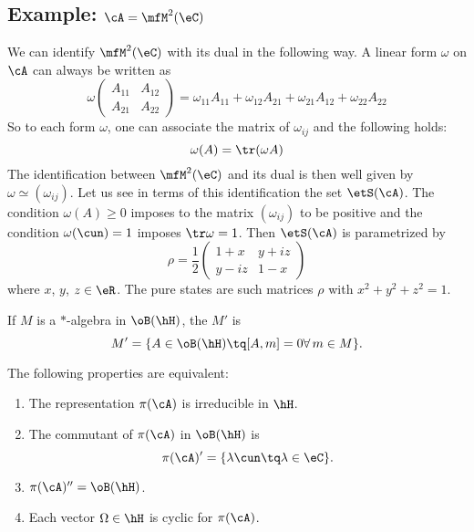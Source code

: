 \subsection*{Example: \texorpdfstring{$\cA=\mfM^2(\eC)$}{A=M2C}}
We can identify $\mfM^2(\eC)$ with its dual in the following way. A linear form $\omega$ on $\cA$ can always be written as
\[
	\omega
	\begin{pmatrix}
		A_{11} & A_{12} \\
		A_{21} & A_{22}
	\end{pmatrix}
	=\omega_{11}A_{11} +\omega_{12}A_{21}+ \omega_{21}A_{12}+ \omega_{22}A_{22}
\]
So to each form $\omega$, one can associate the matrix of $\omega_{ij}$ and the following holds:
\[
	\omega(A)=\tr(\omega A)
\]
The identification between $\mfM^2(\eC)$ and its dual is then well given by $\omega\simeq(\omega_{ij})$. Let us see in terms of this identification the set $\etS(\cA)$. The condition $\omega(A)\geq 0$ imposes to the matrix $(\omega_{ij})$ to be positive and the condition $\omega(\cun)=1$ imposes $\tr\omega=1$. Then $\etS(\cA)$ is parametrized by
\[
	\rho=\frac{ 1 }{2}
	\begin{pmatrix}
		1+x  & y+iz \\
		y-iz & 1-x
	\end{pmatrix}
\]
where $x$, $y$, $z\in\eR$. The pure states are such matrices $\rho$ with $x^2+y^2+z^2=1$.

If $M$ is a $*$-algebra in $\oB(\hH)$, the  $M'$ is
\[
	M'=\{ A\in\oB(\hH)\tq [A,m]=0    \forall\, m\in M \}.
\]

\begin{proposition}
	The following properties are equivalent:

	\begin{enumerate}
		\item \label{enumgz} The representation $\pi(\cA)$ is irreducible in $\hH$.
		      \item\label{enumgi} The commutant of $\pi(\cA)$ in $\oB(\hH)$ is
		      \[
			      \pi(\cA)'=\{ \lambda\cun\tq\lambda\in\eC \}.
		      \]
		\item \label{enumgii} $\pi(\cA)''=\oB(\hH)$.

		\item \label{enumgiii} Each vector $\Omega\in\hH$ is cyclic for $\pi(\cA)$.

	\end{enumerate}
	\label{prop_equiv_rep_irred}
\end{proposition}

